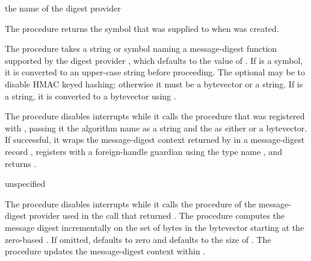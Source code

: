\begin{procedure}
\end{procedure}
\returns{} the name of the digest provider

The  procedure returns the symbol
that was supplied to  when 
was created.

\begin{procedure}
\end{procedure}

The  procedure takes a string or symbol 
naming a message-digest function supported by the digest provider
, which defaults to the value of .
If  is a symbol, it is converted to an upper-case string
before proceeding.
The optional  may be  to disable HMAC keyed
hashing; otherwise it must be a bytevector or a string.
If  is a string, it is converted to a bytevector
using .

The  procedure disables interrupts while it calls the 
procedure that was registered with , passing it the
algorithm name as a string and the  as either  or a
bytevector.
If successful, it wraps the message-digest context returned by 
in a message-digest record , registers 
with a foreign-handle guardian using the type name ,
and returns .

\begin{procedure}
\end{procedure}
\returns{} unspecified

The  procedure disables interrupts while it calls the 
procedure of the message-digest provider used in the 
call that returned .
The  procedure computes the message digest incrementally
on the set of  bytes in the bytevector  starting at
the zero-based .
If omitted,  defaults to zero and  defaults
to the size of .
The  procedure updates the message-digest context within .

